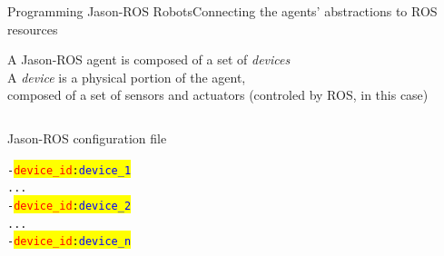 \documentclass[compress]{beamer}
\newcommand{\yamlkey}[1]{\textcolor{red}{\texttt{#1}}}
\newcommand{\yamlvalue}[1]{\textcolor{blue}{\texttt{#1}}}
\begin{document}
\begin{frame}[fragile]{Programming Jason-ROS Robots}{Connecting the agents' abstractions to ROS resources}

    \footnotesize
    
    A Jason-ROS agent is composed of a set of \textit{devices}\\
    
    A \textit{device} is a physical portion of the agent,\\ composed of a set of sensors and actuators {\tiny (\tiny controled by ROS, in this case)}
    
    \vspace{.5cm}
    
  \begin{columns}
            \begin{block}{{\ssmall Jason-ROS configuration file}}
                \scriptsize
                \begin{alltt} \tiny
- \colorbox{yellow}{\yamlkey{device\_id}: \yamlvalue{device_1}}
    ...
- \colorbox{yellow}{\yamlkey{device\_id}: \yamlvalue{device_2}}      
    ...
- \colorbox{yellow}{\yamlkey{device\_id}: \yamlvalue{device_n}}    
                \end{alltt}

            \end{block}    
 \end{columns}
\end{frame}
\end{document}
